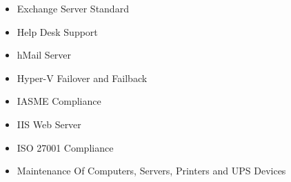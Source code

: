 \documentclass[letterpaper, 10pt]{article}
\begin{document}
\begin{minipage}[t]{0.5\textwidth}
\begin{itemize}
			\item Exchange Server Standard
			
			\item Help Desk Support
			
			\item hMail Server
			
			\item Hyper-V Failover and Failback
			
			\item IASME Compliance
			
			\item IIS Web Server
			
			\item ISO 27001 Compliance
			
			\item Maintenance Of Computers, Servers, Printers and UPS Devices
		\end{itemize}
	\end{minipage}%
\end{document}

